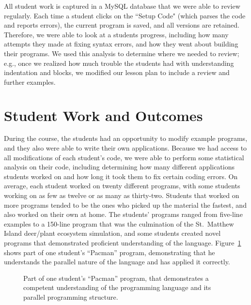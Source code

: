 \documentclass{sig-alternate}
\newcommand{\INDSTATE}[1][1]{\STATE\hspace{#1\algorithmicindent}}
\begin{document}
All student work is captured in a MySQL database that we were able to review regularly.  Each time
a student clicks on the ``Setup Code" (which parses the code and reports errors), the current
program is saved, and all versions are retained.  Therefore, we were able to look at a students 
progress, including how many attempts they made at fixing syntax errors, and how they went about
building their programs.  We used this analysis to determine where we needed to review; e.g.,
once we realized how much trouble the students had with understanding indentation and blocks, we
modified our lesson plan to include a review and further examples.

\section{Student Work and Outcomes}
During the course, the students had an opportunity to modify example programs, and they also were able to write their own applications.  
Because we had access to all modifications of each student's code, we were able to perform some
statistical analysis on their code, including determining how many different applications 
students worked on and how long it took them to fix certain coding errors.  On average, 
each student worked on twenty different programs, with some students working on as few as twelve or as many as thirty-two.  Students that worked on more programs tended to be the ones who picked up
the material the fastest, and also worked on their own at home.  The students' programs ranged 
from five-line examples to a 150-line program that 
was the culmination of the St.~Matthew Island deer/plant ecosystem simulation, and some students
created novel programs that demonstrated proficient understanding of the language.  
Figure~\ref{fig:pacmanProgram} shows part of one student's ``Pacman'' program, demonstrating that
he understands the parallel nature of the language and has applied it correctly.

\begin{figure}
\begin{algorithmic}[1]
\setcounter{ALC@line}{22}
  \INDSTATE{for each pacman}
    \INDSTATE[2]{do in any order}
      \INDSTATE[3]{move the pacman's position a random number between 10 and 50 right}
      \INDSTATE[3]{move the pacman's position a random number between 10 and 50 left}
      \INDSTATE[3]{move the pacman's position a random number between 10 and 50 up}
      \INDSTATE[3]{move the pacman's position a random number between 10 and 50 down}
\STATE
{}
  \INDSTATE{destroy the pacman}
\end{algorithmic} 
\caption{Part of one student's ``Pacman'' program, that demonstrates a competent understanding
of the programming language and its parallel programming structure.}
\label{fig:pacmanProgram} 
\end{figure}
\end{document}
